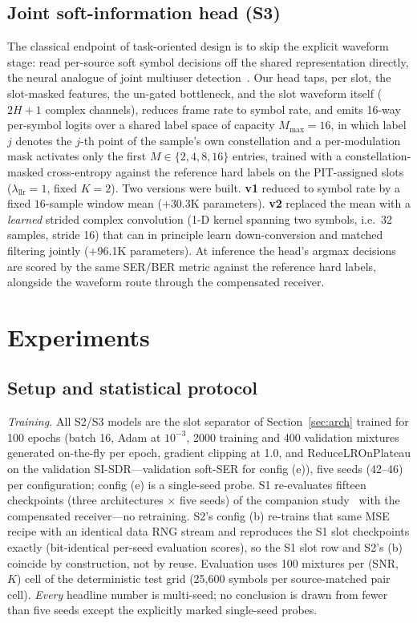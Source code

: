 \documentclass[review,12pt]{elsarticle}
\begin{document}
\subsection{Joint soft-information head (S3)}
\label{sec:jointhead}

The classical endpoint of task-oriented design is to skip the explicit
waveform stage: read per-source soft symbol decisions off the shared
representation directly, the neural analogue of joint multiuser
detection~\cite{verdu1998multiuser}. Our head taps, per slot, the
slot-masked features, the un-gated bottleneck, and the slot waveform
itself ($2H{+}1$ complex channels), reduces frame rate to symbol rate,
and emits 16-way per-symbol logits over a shared label space of capacity
$M_{\max}{=}16$, in which label $j$ denotes the $j$-th point of the
sample's own constellation and a per-modulation mask activates only the
first $M \in \{2,4,8,16\}$ entries, trained with a constellation-masked
cross-entropy against the reference
hard labels on the PIT-assigned slots ($\lambda_{\mathrm{llr}} = 1$,
fixed $K{=}2$). Two versions were built. \textbf{v1} reduced to symbol
rate by a fixed $16$-sample window mean ($+$30.3K parameters).
\textbf{v2} replaced the mean with a \emph{learned} strided complex
convolution (1-D kernel spanning two symbols, i.e.\ 32 samples, stride
16) that can in principle learn
down-conversion and matched filtering jointly ($+$96.1K parameters).
At inference the head's argmax decisions are scored by the same SER/BER
metric against the reference hard labels, alongside the waveform route
through the compensated receiver.


\section{Experiments}
\label{sec:exp}

\subsection{Setup and statistical protocol}
\label{sec:expsetup}

\emph{Training.} All S2/S3 models are the slot separator of
Section~\ref{sec:arch} trained for 100 epochs (batch 16, Adam at
$10^{-3}$, 2000 training and 400 validation mixtures generated
on-the-fly per epoch, gradient clipping at 1.0, and ReduceLROnPlateau on
the validation SI-SDR---validation soft-SER for config (e)), five seeds (42--46) per configuration; config (e)
is a single-seed probe. S1 re-evaluates fifteen checkpoints (three
architectures $\times$ five seeds) of the companion
study~\cite{nong2026openworld} with the compensated receiver---no
retraining. S2's config (b) re-trains that same MSE recipe with an
identical data RNG stream and reproduces the S1 slot checkpoints
exactly (bit-identical per-seed evaluation scores), so the S1 slot row
and S2's (b) coincide by construction, not by reuse. Evaluation uses
100 mixtures per (SNR, $K$) cell of the
deterministic test grid (25,600 symbols per source-matched pair cell).
\emph{Every} headline number is multi-seed; no conclusion is drawn from
fewer than five seeds except the explicitly marked single-seed probes.
\end{document}
